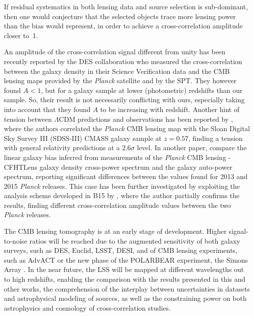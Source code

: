 If residual systematics in both lensing data and source selection is sub-dominant, then one would conjecture that the selected objects trace more lensing power than the bias would represent, in order to achieve a cross-correlation amplitude closer to~1.

An amplitude of the cross-correlation signal different from unity has been recently reported by the DES collaboration \citep{Giannantonio2016a} who measured the cross-correlation between the galaxy density in their Science Verification data and the CMB lensing maps provided by the \textit{Planck} satellite and by the SPT. They however found $A< 1$, but for a galaxy sample at lower
(photometric) redshifts than our sample. So, their result is not necessarily conflicting with ours, especially taking into account that they found $A$ to be increasing with redshift. Another hint of tension between $\Lambda$CDM predictions and observations has been reported by \cite{Pullen2016}, where the authors correlated the \emph{Planck} CMB lensing map with the Sloan Digital Sky Survey III (SDSS-III) CMASS galaxy sample at $z =0.57$, finding a tension with general relativity predictions at a $2.6\sigma$ level. In another paper, \cite{Omori2015} compare the linear galaxy bias inferred from measurements of the \emph{Planck} CMB lensing - CFHTLens galaxy density cross-power spectrum and the galaxy auto-power spectrum, reporting significant differences between the values found for 2013 and 2015 \emph{Planck} releases. This case has been further investigated by exploiting the analysis scheme developed in B15 by \cite{Kuntz2015}, where the author partially confirms the \cite{Omori2015} results, finding different cross-correlation amplitude values between the two \emph{Planck} releases.

The CMB lensing tomography is at an early stage of development. Higher signal-to-noise ratios will be reached due to the augmented sensitivity of both galaxy surveys, such as DES, Euclid, LSST, DESI, and of CMB lensing experiments, such as AdvACT \citep{Calabrese2014} or the new phase of the POLARBEAR experiment, the Simons Array \citep{Ade2014i}. In the near future, the LSS will be mapped at different wavelengths out to high redshifts, enabling the comparison with the results presented in this and other works, the comprehension of the interplay between uncertainties in datasets and astrophysical modeling of sources, as well as the constraining power on both astrophysics and cosmology of cross-correlation studies.
